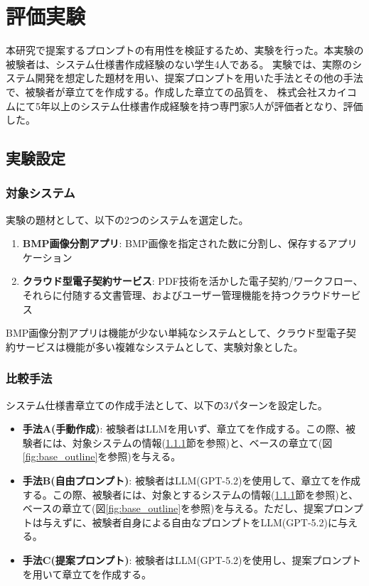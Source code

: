 \chapter{評価実験}\label{cha:Evaluation}

本研究で提案するプロンプトの有用性を検証するため、実験を行った。本実験の被験者は、システム仕様書作成経験のない学生4人である。
実験では、実際のシステム開発を想定した題材を用い、提案プロンプトを用いた手法とその他の手法で、被験者が章立てを作成する。作成した章立ての品質を、
株式会社スカイコム\cite{skycom}にて5年以上のシステム仕様書作成経験を持つ専門家5人が評価者となり、評価した。


\section{実験設定}

\subsection{対象システム}
\label{sec:target_system}

実験の題材として、以下の2つのシステムを選定した。
\begin{enumerate}
    \item \textbf{BMP画像分割アプリ}: BMP画像を指定された数に分割し、保存するアプリケーション
    \item \textbf{クラウド型電子契約サービス}: PDF技術を活かした電子契約/ワークフロー、それらに付随する文書管理、およびユーザー管理機能を持つクラウドサービス
\end{enumerate}

BMP画像分割アプリは機能が少ない単純なシステムとして、クラウド型電子契約サービスは機能が多い複雑なシステムとして、実験対象とした。

\subsection{比較手法}

システム仕様書章立ての作成手法として、以下の3パターンを設定した。
\begin{itemize}
    \item \textbf{手法A(手動作成)}: 被験者はLLMを用いず、章立てを作成する。この際、被験者には、対象システムの情報(\ref{sec:target_system}節を参照)と、ベースの章立て(図\ref{fig:base_outline}を参照)を与える。
    \item \textbf{手法B(自由プロンプト)}: 被験者はLLM(GPT-5.2)を使用して、章立てを作成する。この際、被験者には、対象とするシステムの情報(\ref{sec:target_system}節を参照)と、ベースの章立て(図\ref{fig:base_outline}を参照)を与える。ただし、提案プロンプトは与えずに、被験者自身による自由なプロンプトをLLM(GPT-5.2)に与える。
    \item \textbf{手法C(提案プロンプト)}: 被験者はLLM(GPT-5.2)を使用し、提案プロンプトを用いて章立てを作成する。
\end{itemize}

